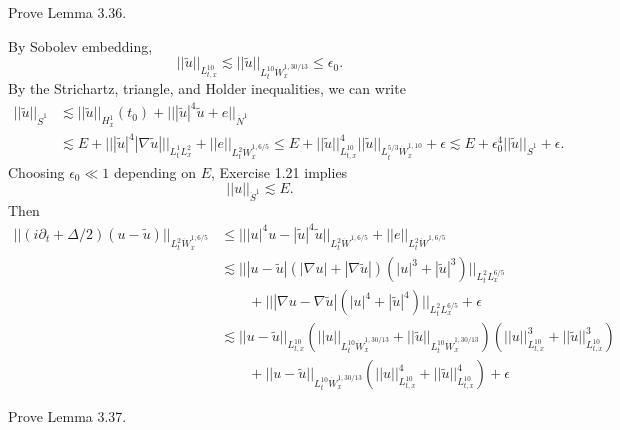 \begin{statement}
	Prove Lemma 3.36.
\end{statement}

\begin{solution}
	By Sobolev embedding, 	
		\[ ||\widetilde u||_{L^{10}_{t, x}} \lesssim ||\widetilde u||_{L^{10}_t \dot W^{1, 30/13}_x} \leq \epsilon_0. \]
	By the Strichartz, triangle, and Holder inequalities, we can write
		\begin{align*}
			||\widetilde u||_{\dot S^1}
				&\lesssim ||\widetilde u||_{H^1_x} (t_0) + || |\widetilde u|^4 \widetilde u + e||_{\dot N^1}\\
				&\lesssim E + || |\widetilde u|^4 |\nabla \widetilde u|||_{L^1_t L^2_x} + ||e||_{L^2_t \dot W^{1, 6/5}_x} \leq E + ||\widetilde u||_{L^{10}_{t, x}}^4 ||\widetilde u||_{L^{5/3}_t \dot W^{1, 10}_x}  + \epsilon \lesssim E + \epsilon_0^4 ||\widetilde u||_{\dot S^1} + \epsilon.
		\end{align*}	
	Choosing $\epsilon_0 \ll 1$ depending on $E$, Exercise 1.21	implies
		\[ ||u||_{\dot S^1} \lesssim E. \]
	Then 
		\begin{align*}
			||(i \partial_t + \Delta/2) (u - \widetilde u)||_{L^2_t \dot W^{1, 6/5}_x}
				&\leq || |u|^4 u - |\widetilde u|^4 \widetilde u ||_{L^2_t \dot W^{1, 6/5}} + ||e||_{L^2_t \dot W^{1, 6/5}}\\
				&\lesssim || | u - \widetilde u| (|\nabla  u| + |\nabla \widetilde u|) (|u|^3 + |\widetilde u|^3) ||_{L^2_t L^{6/5}_x} \\
				&\qquad + || |\nabla u - \nabla \widetilde u| (|u|^4 + |\widetilde u|^4)||_{L^2_t L^{6/5}_x} + \epsilon \\
				&\lesssim || u - \widetilde u||_{L^{10}_{t, x}} (||u||_{L^{10}_t \dot W^{1, 30/13}_x} + ||\widetilde u||_{L^{10}_t \dot W^{1, 30/13}_x}) (||u||_{L^{10}_{t, x}}^3 + ||\widetilde u||_{L^{10}_{t, x}}^3) \\
				&\qquad + || u - \widetilde u||_{L^{10}_t \dot W^{1, 30/13}_x} (||u||_{L^{10}_{t, x}}^4 + ||\widetilde u||_{L^{10}_{t, x}}^4) + \epsilon
		\end{align*}	
\end{solution}

\begin{statement}
	Prove Lemma 3.37.
\end{statement}

